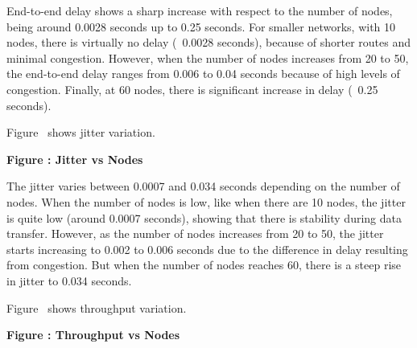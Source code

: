 \documentclass[a4paper,fleqn]{cas-dc}
\numberwithin{equation}{section}
\begin{document}
End-to-end delay shows a sharp increase with respect to the number of nodes, being around 0.0028 seconds up to 0.25 seconds. For smaller networks, with 10 nodes, there is virtually no delay (~0.0028 seconds), because of shorter routes and minimal congestion. However, when the number of nodes increases from 20 to 50, the end-to-end delay ranges from 0.006 to 0.04 seconds because of high levels of congestion. Finally, at 60 nodes, there is significant increase in delay (~0.25 seconds).

\vspace{0.5cm}

\noindent Figure \thefigure\ shows jitter variation.

\begin{center}

\textbf{Figure \thefigure: Jitter vs Nodes}
\label{fig:jitter_density}
\end{center}

The jitter varies between 0.0007 and 0.034 seconds depending on the number of nodes. When the number of nodes is low, like when there are 10 nodes, the jitter is quite low (around 0.0007 seconds), showing that there is stability during data transfer. However, as the number of nodes increases from 20 to 50, the jitter starts increasing to 0.002 to 0.006 seconds due to the difference in delay resulting from congestion. But when the number of nodes reaches 60, there is a steep rise in jitter to 0.034 seconds.

\vspace{0.5cm}

\noindent Figure \thefigure\ shows throughput variation.

\begin{center}

\textbf{Figure \thefigure: Throughput vs Nodes}
\label{fig:throughput_density}
\end{center}
\end{document}
